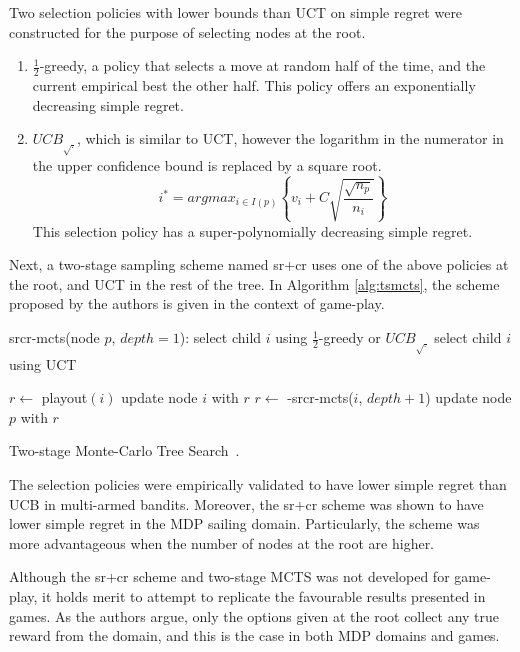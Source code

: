 \documentclass{kecsmstr}
\newcommand{\func}[1]{{\sc #1}}
\begin{document}
Two selection policies with lower bounds than UCT on simple regret were constructed for the purpose of selecting nodes at the root.
\begin{enumerate}
\item $\frac{1}{2}$-greedy, a policy that selects a move at random half of the time, and the current empirical best the other half. This policy offers an exponentially decreasing simple regret.
\item ${UCB}_{\sqrt{.}}$, which is similar to UCT, however the logarithm in the numerator in the upper confidence bound is replaced by a square root.
\begin{equation}
\label{eq:uctsqrt}
i^* = argmax_{i \in I(p)}\left\{ v_i + C \sqrt{ \frac{\sqrt{n_p}}{n_i}}\right\}
\end{equation}
This selection policy has a super-polynomially decreasing simple regret.
\end{enumerate}

Next, a two-stage sampling scheme named {\sc sr+cr} uses one of the above policies at the root, and UCT in the rest of the tree. In Algorithm \ref{alg:tsmcts}, the scheme proposed by the authors is given in the context of game-play.
\IncMargin{1em}
\begin{algorithm2e}[ht]
	\func{srcr-mcts}(node $p$, $depth = 1$):														\;
	\Indp							
	 {
	select child $i$ using $\frac{1}{2}$-greedy or ${UCB}_{\sqrt{.}}$								\;
	}
	{
	select child $i$ using UCT 																		\;
	}

     {
    	$r \gets$ {\sc playout}$(i)$ 																\;
    	\func{update} node $i$ with $r$																\;
    }
    {
    	$r \gets$ -\func{srcr-mcts}($i$, $depth + 1$)												\;
    }	
    \func{update} node $p$ with $r$																	\;
	\Indm
  \caption[Two-stage Monte-Carlo Tree Search]{Two-stage Monte-Carlo Tree Search~\protect{}. \label{alg:tsmcts}}
\end{algorithm2e}
\DecMargin{1em}

The selection policies were empirically validated to have lower simple regret than UCB in multi-armed bandits. Moreover, the {\sc sr+cr} scheme was shown to have lower simple regret in the MDP sailing domain. Particularly, the scheme was more advantageous when the number of nodes at the root are higher.

Although the {\sc sr+cr} scheme and two-stage MCTS was not developed for game-play, it holds merit to attempt to replicate the favourable results presented in games. As the authors argue, only the options given at the root collect any true reward from the domain, and this is the case in both MDP domains and games.
\end{document}
